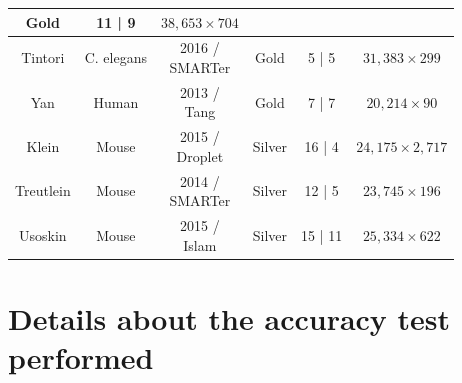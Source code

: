 \documentclass{report}
\begin{document}
{\begin{table}[H]
\begin{tabular}{| c | c | c | c | c | c |}
\parbox[c]{2cm}{Gold}&
\parbox[c]{2cm}{11 | 9}&
\parbox[c]{2cm}{$38,653 \times 704$}\\
\hline
\parbox[c]{3cm}{Tintori\cite{tintori2016transcriptional}}& 
\parbox[c]{2cm}{C. elegans}& 
\parbox[c]{3cm}{2016 /\\SMARTer} & 
\parbox[c]{2cm}{Gold}&
\parbox[c]{2cm}{5 | 5}&
\parbox[c]{2cm}{$31,383 \times 299$}\\
\hline
\parbox[c]{3cm}{Yan\cite{yan2013single}}& 
\parbox[c]{2cm}{Human} & 
\parbox[c]{3cm}{2013 /\\Tang} & 
\parbox[c]{2cm}{Gold} &
\parbox[c]{2cm}{7 | 7}&
\parbox[c]{2cm}{$20,214 \times 90$}\\
\hline
\parbox[c]{3cm}{Klein\cite{klein2015droplet}} & 
\parbox[c]{2cm}{Mouse} & 
\parbox[c]{3cm}{2015 /\\Droplet} & 
\parbox[c]{2cm}{Silver}&
\parbox[c]{2cm}{16 | 4}&
\parbox[c]{2cm}{$24,175 \times 2,717$}\\
\hline
\parbox[c]{3cm}{Treutlein\cite{treutlein2014reconstructing}} & 
\parbox[c]{2cm}{Mouse} & 
\parbox[c]{3cm}{2014 /\\SMARTer} & 
\parbox[c]{2cm}{Silver} &
\parbox[c]{2cm}{12 | 5}&
\parbox[c]{2cm}{$23,745 \times 196$}\\
\hline
\parbox[c]{3cm}{Usoskin\cite{usoskin2015unbiased}} & 
\parbox[c]{2cm}{Mouse} & 
\parbox[c]{3cm}{2015 /\\Islam} & 
\parbox[c]{2cm}{Silver} &
\parbox[c]{2cm}{15 | 11}&
\parbox[c]{2cm}{$25,334 \times 622$}\\
\hline
\end{tabular}
\label{datasets}
\end{table}

\section*{Details about the accuracy test performed}

}
\end{document}
